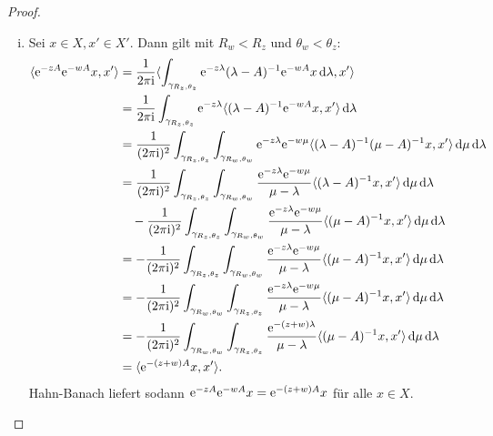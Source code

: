 \begin{proof}
\begin{enumerate}[(i)]
    \item Sei $x \in X, x' \in X'$.
      Dann gilt mit $R_w < R_z$ und $\theta_w < \theta_z$:
      \begin{align*}
        \langle \e^{-zA} \e^{-wA} x, x' \rangle
        &= \frac{1}{2\pi \ii} \langle \int_{\gamma_{R_z, \theta_z}} \e^{-z\lambda} (\lambda - A)^{-1} \e^{-wA} x \d \lambda, x' \rangle \\
        &= \frac{1}{2\pi \ii} \int_{\gamma_{R_z, \theta_z}} \e^{-z\lambda} \langle (\lambda - A)^{-1} \e^{-wA} x, x' \rangle \d \lambda\\
        &= \frac{1}{(2\pi \ii)^2} \int_{\gamma_{R_z, \theta_z}} \int_{\gamma_{R_w, \theta_w}}  \e^{-z\lambda} \e^{-w \mu} \langle (\lambda - A)^{-1} (\mu - A)^{-1} x, x' \rangle \d \mu \d \lambda\\
        &= \frac{1}{(2\pi \ii)^2} \int_{\gamma_{R_z, \theta_z}} \int_{\gamma_{R_w, \theta_w}}  \frac{\e^{-z\lambda} \e^{-w \mu}}{\mu - \lambda} \langle (\lambda - A)^{-1} x, x' \rangle \d \mu \d \lambda\\
        &\quad - \frac{1}{(2\pi \ii)^2} \int_{\gamma_{R_z, \theta_z}} \int_{\gamma_{R_w, \theta_w}}  \frac{\e^{-z\lambda} \e^{-w \mu}}{\mu - \lambda} \langle (\mu - A)^{-1} x, x' \rangle \d \mu \d \lambda\\
        &= - \frac{1}{(2\pi \ii)^2} \int_{\gamma_{R_z, \theta_z}} \int_{\gamma_{R_w, \theta_w}}  \frac{\e^{-z\lambda} \e^{-w \mu}}{\mu - \lambda} \langle (\mu - A)^{-1} x, x' \rangle \d \mu \d \lambda\\
        &= - \frac{1}{(2\pi \ii)^2} \int_{\gamma_{R_w, \theta_w}} \int_{\gamma_{R_z, \theta_z}}  \frac{\e^{-z\lambda} \e^{-w \mu}}{\mu - \lambda} \langle (\mu - A)^{-1} x, x' \rangle \d \mu \d \lambda\\
        &= - \frac{1}{(2\pi \ii)^2} \int_{\gamma_{R_w, \theta_w}} \int_{\gamma_{R_z, \theta_z}}  \frac{\e^{-(z+ w)\lambda}}{\mu - \lambda} \langle (\mu - A)^{-1} x, x' \rangle \d \mu \d \lambda\\
        &= \langle \e^{-(z + w)A} x, x' \rangle.
      \end{align*}
      Hahn-Banach liefert sodann $\mathrm{e}^{-zA}\mathrm{e}^{-wA} x = \mathrm{e}^{-(z + w)A}x$ für alle $x \in X$. 


\end{enumerate}
\end{proof}
